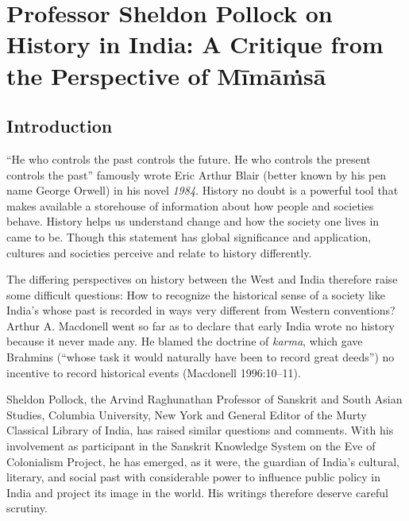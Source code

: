 
\chapter{Professor Sheldon Pollock on History in India: A Critique from the Perspective of Mīmāṁsā}



\section*{Introduction}

“He who controls the past controls the future. He who controls the present controls the past” famously wrote Eric Arthur Blair (better known by his pen name George Orwell) in his novel \textit{1984}. History no doubt is a powerful tool that makes available a storehouse of information about how people and societies behave. History helps us understand change and how the society one lives in came to be. Though this statement has global significance and application, cultures and societies perceive and relate to history differently.

The differing perspectives on history between the West and India therefore raise some difficult questions: How to recognize the historical sense of a society like India’s whose past is recorded in ways very different from Western conventions? Arthur A. Macdonell went so far as to declare that early India wrote no history because it never made any. He blamed the doctrine of \textit{karma}, which gave Brahmins (“whose task it would naturally have been to record great deeds”) no incentive to record historical events (Macdonell 1996:10–11).

\newpage

Sheldon Pollock, the Arvind Raghunathan Professor of Sanskrit and South Asian Studies, Columbia University, New York and General Editor of the Murty Classical Library of India, has raised similar questions and comments. With his involvement as participant in the Sanskrit Knowledge System on the Eve of Colonialism Project, he has emerged, as it were, the guardian of India’s cultural, literary, and social past with considerable power to influence public policy in India and project its image in the world. His writings therefore deserve careful scrutiny.


